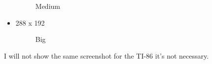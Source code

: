 \documentclass[10pt]{report}
\begin{document}
\begin{itemize}
\begin{figure}[H]
\caption{Medium}
\end{figure}
\item 288 x 192
\begin{figure}[H]
\centering
{}
\caption{Big}
\end{figure}
\end{itemize}

I will not show the same screenshot for the TI-86 it's not necessary.\newline
\end{document}
